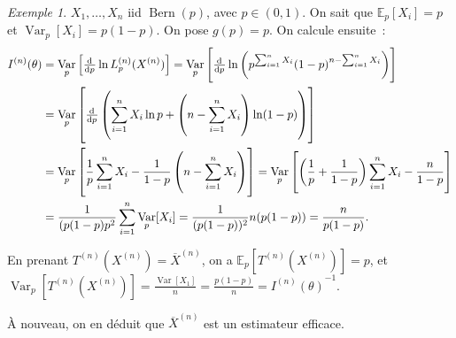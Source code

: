 \documentclass{report}
\DeclareMathOperator{\Bern}{Bern}  %
\DeclareMathOperator{\Var}{Var}
\newcommand{\E}{\mathbb E}
\newcommand{\Xn}{{X^{(n)}}}
\newcommand{\Tn}{{T^{(n)}}}
\newcommand{\TnXn}{{\Tn(\Xn)}}
\theoremstyle{definition}
\theoremstyle{remark}
\newtheorem{ex}{Exemple}[chapter]
\begin{document}
			\begin{ex} $X_1, \ldots, X_n$ iid $\Bern(p)$, avec $p \in (0, 1)$. On sait que $\E_p[X_i] = p$ et $\Var_p[X_i] = p(1-p)$. On pose $g(p) = p$.
			On calcule ensuite~:
			\begin{align*}
				I^{(n)}(\theta) &= \Var_p\left[\od {}p \ln L_p^{(n)}(X^{(n)})\right] = \Var_p\left[\od {}p\ln\left(p^{\sum_{i=1}^nX_i}(1-p)^{n-\sum_{i=1}^nX_i}\right)\right] \\
				&= \Var_p\left[\od {}p\left(\sum_{i=1}^nX_i \ln p + \left(n - \sum_{i=1}^nX_i\right)\ln(1-p)\right)\right] \\
				&= \Var_p\left[\frac 1p\sum_{i=1}^nX_i - \frac 1{1-p}\left(n-\sum_{i=1}^nX_i\right)\right]
					= \Var_p\left[\left(\frac 1p+\frac 1{1-p}\right)\sum_{i=1}^nX_i -\frac n{1-p}\right] \\
				&= \frac 1{(p(1-p)p^2}\sum_{i=1}^n\Var_p[X_i] = \frac 1{(p(1-p))^2}n(p(1-p)) = \frac n{p(1-p)}.
			\end{align*}

			En prenant $\TnXn = \overline X^{(n)}$, on a $\E_p[\TnXn] = p$, et $\Var_p[\TnXn] = \frac {\Var[X_1]}n = \frac {p(1-p)}n = {I^{(n)}(\theta)}^{-1}$.

			À nouveau, on en déduit que $\overline X^{(n)}$ est un estimateur efficace.
			\end{ex}
\end{document}
